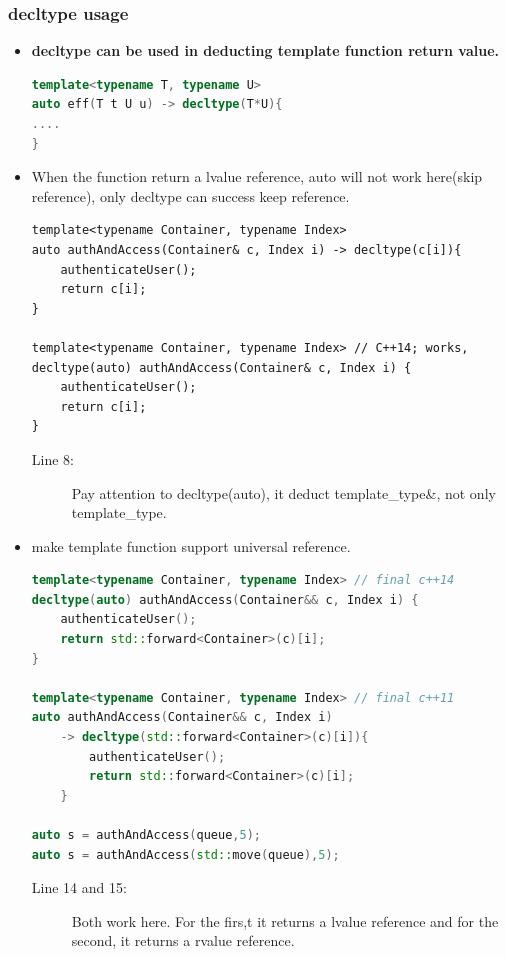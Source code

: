 \documentclass[a4paper,11pt,twoside]{book}
\begin{document}
\subsubsection{decltype usage}
\begin{itemize}
	
	\item \textbf{decltype can be used in deducting template function return value.}
\begin{lstlisting}[frame=single, language=c++, mathescape=true]
template<typename T, typename U>
auto eff(T t U u) -> decltype(T*U){
....
}
\end{lstlisting}
	\item When the function return a lvalue reference, auto will not work here(skip reference), only decltype can success keep reference.
\begin{lstlisting}
template<typename Container, typename Index>
auto authAndAccess(Container& c, Index i) -> decltype(c[i]){
	authenticateUser();
	return c[i];
}

template<typename Container, typename Index> // C++14; works,
decltype(auto) authAndAccess(Container& c, Index i) {
	authenticateUser();
	return c[i];
}
\end{lstlisting}
\begin{description}
	\item[Line 8:] Pay attention to decltype(auto), it deduct template\_type\&, not only template\_type.
\end{description}
	
	\item make template function support universal reference.
\begin{lstlisting}[frame=single, language=c++, mathescape=true]
template<typename Container, typename Index> // final c++14
decltype(auto) authAndAccess(Container&& c, Index i) {
	authenticateUser();
	return std::forward<Container>(c)[i];
}
	
template<typename Container, typename Index> // final c++11
auto authAndAccess(Container&& c, Index i)
	-> decltype(std::forward<Container>(c)[i]){
		authenticateUser();
		return std::forward<Container>(c)[i];
	}

auto s = authAndAccess(queue,5);
auto s = authAndAccess(std::move(queue),5); 
\end{lstlisting}
\begin{description}
	\item[Line 14 and 15:] Both work here. For the firs,t it returns a lvalue reference and for the second, it returns a rvalue reference.
\end{description}
	

\end{itemize}
\end{document}
